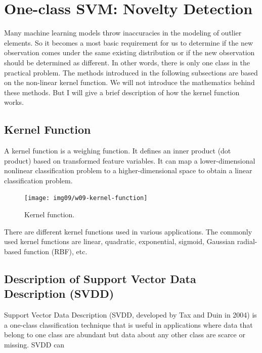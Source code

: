 \documentclass[
]{book}
\begin{document}
\hypertarget{one-class-svm-novelty-detection}{%
\section{One-class SVM: Novelty Detection}\label{one-class-svm-novelty-detection}}

Many machine learning models throw inaccuracies in the modeling of outlier elements. So it becomes a most basic requirement for us to determine if the new observation comes under the same existing distribution or if the new observation should be determined as different. In other words, there is only one class in the practical problem. The methods introduced in the following subsections are based on the non-linear kernel function. We will not introduce the mathematics behind these methods. But I will give a brief description of how the kernel function works.

\hypertarget{kernel-function}{%
\subsection{Kernel Function}\label{kernel-function}}

A kernel function is a weighing function. It defines an inner product (dot product) based on transformed feature variables. It can map a lower-dimensional nonlinear classification problem to a higher-dimensional space to obtain a linear classification problem.

\begin{figure}

{\centering \texttt{[image: img09/w09-kernel-function]} 

}

\caption{Kernel function.}\label{fig:unnamed-chunk-242}
\end{figure}

There are different kernel functions used in various applications. The commonly used kernel functions are linear, quadratic, exponential, sigmoid, Gaussian radial-based function (RBF), etc.

\hypertarget{description-of-support-vector-data-description-svdd}{%
\subsection{Description of Support Vector Data Description (SVDD)}\label{description-of-support-vector-data-description-svdd}}

Support Vector Data Description (SVDD, developed by Tax and Duin in 2004) is a one-class classification technique that is useful in applications where data that belong to one class are abundant but data about any other class are scarce or missing. SVDD can
\end{document}
